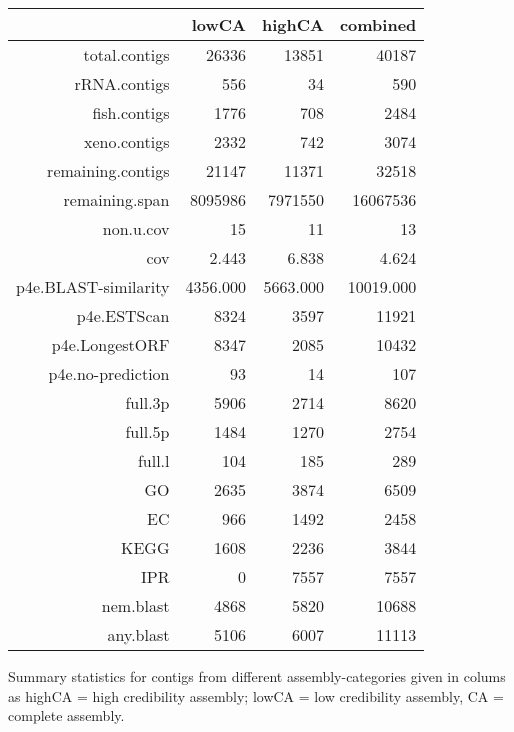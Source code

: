 \documentclass[10pt]{bmc_article}
\newenvironment{bmcformat}{\begin{raggedright}\baselineskip20pt\sloppy\setboolean{publ}{false}}{\end{raggedright}\baselineskip20pt\sloppy}
\begin{document}
\begin{bmcformat}
\begin{table}[ht]
\begin{center}
\begin{tabular}{rrrr}
  \hline
 & lowCA & highCA & combined \\ 
  \hline
total.contigs & 26336 & 13851 & 40187 \\ 
  rRNA.contigs & 556 & 34 & 590 \\ 
  fish.contigs & 1776 & 708 & 2484 \\ 
  xeno.contigs & 2332 & 742 & 3074 \\ 
  remaining.contigs & 21147 & 11371 & 32518 \\ 
  remaining.span & 8095986 & 7971550 & 16067536 \\ 
  non.u.cov & 15 & 11 & 13 \\ 
  cov & 2.443 & 6.838 & 4.624 \\ 
  p4e.BLAST-similarity & 4356.000 & 5663.000 & 10019.000 \\ 
  p4e.ESTScan & 8324 & 3597 & 11921 \\ 
  p4e.LongestORF & 8347 & 2085 & 10432 \\ 
  p4e.no-prediction & 93 & 14 & 107 \\ 
  full.3p & 5906 & 2714 & 8620 \\ 
  full.5p & 1484 & 1270 & 2754 \\ 
  full.l & 104 & 185 & 289 \\ 
  GO & 2635 & 3874 & 6509 \\ 
  EC & 966 & 1492 & 2458 \\ 
  KEGG & 1608 & 2236 & 3844 \\ 
  IPR & 0 & 7557 & 7557 \\ 
  nem.blast & 4868 & 5820 & 10688 \\ 
  any.blast & 5106 & 6007 & 11113 \\ 
   \hline
\end{tabular}
\end{center}
\end{table}
Summary statistics for contigs from different assembly-categories
given in colums as highCA = high credibility assembly; lowCA = low
credibility assembly, CA = complete assembly.


\end{bmcformat}
\end{document}
